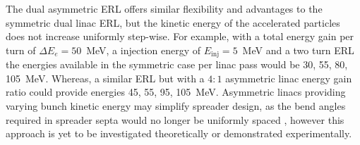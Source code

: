 \documentclass[../main.tex]{subfiles}
\begin{document}
The dual asymmetric ERL offers similar flexibility and advantages to the symmetric dual linac ERL, but the kinetic energy of the accelerated particles does not increase uniformly step-wise. For example, with a total energy gain per turn of $\Delta E_{e} = 50$~\si{\mega\electronvolt}, a injection energy of $E_{\mathrm{inj}}=5$~\si{\mega\electronvolt} and a two turn ERL the energies available in the symmetric case per linac pass would be 30, 55, 80, 105~\si{\mega\electronvolt}. Whereas, a similar ERL but with a $4:1$ asymmetric linac energy gain ratio could provide energies 45, 55, 95, 105~\si{\mega\electronvolt}. Asymmetric linacs providing varying bunch kinetic energy may simplify spreader design, as the bend angles required in spreader septa would no longer be uniformly spaced \cite{segurana2020}, however this approach is yet to be investigated theoretically or demonstrated experimentally.
\end{document}
